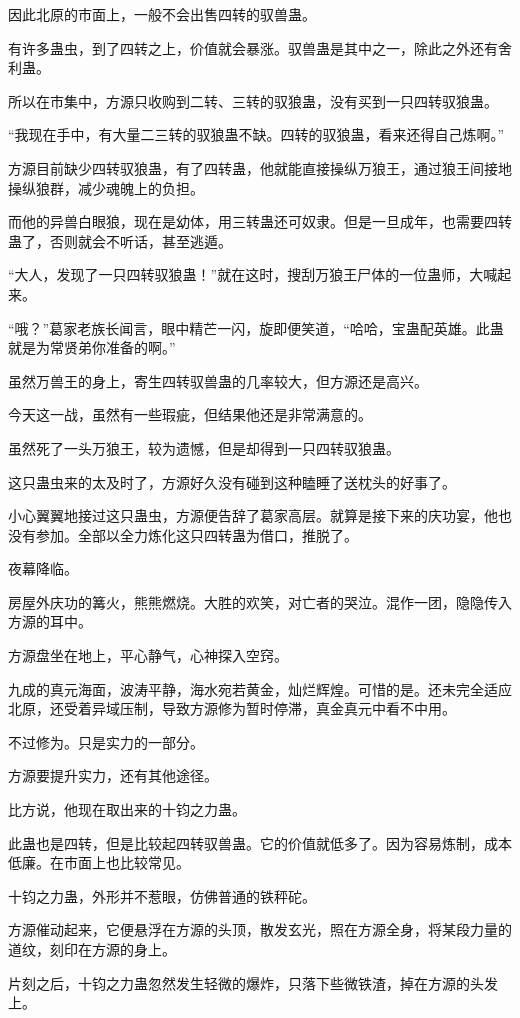 \begin{this_body}
因此北原的市面上，一般不会出售四转的驭兽蛊。

有许多蛊虫，到了四转之上，价值就会暴涨。驭兽蛊是其中之一，除此之外还有舍利蛊。

所以在市集中，方源只收购到二转、三转的驭狼蛊，没有买到一只四转驭狼蛊。

“我现在手中，有大量二三转的驭狼蛊不缺。四转的驭狼蛊，看来还得自己炼啊。”

方源目前缺少四转驭狼蛊，有了四转蛊，他就能直接操纵万狼王，通过狼王间接地操纵狼群，减少魂魄上的负担。

而他的异兽白眼狼，现在是幼体，用三转蛊还可奴隶。但是一旦成年，也需要四转蛊了，否则就会不听话，甚至逃遁。

“大人，发现了一只四转驭狼蛊！”就在这时，搜刮万狼王尸体的一位蛊师，大喊起来。

“哦？”葛家老族长闻言，眼中精芒一闪，旋即便笑道，“哈哈，宝蛊配英雄。此蛊就是为常贤弟你准备的啊。”

虽然万兽王的身上，寄生四转驭兽蛊的几率较大，但方源还是高兴。

今天这一战，虽然有一些瑕疵，但结果他还是非常满意的。

虽然死了一头万狼王，较为遗憾，但是却得到一只四转驭狼蛊。

这只蛊虫来的太及时了，方源好久没有碰到这种瞌睡了送枕头的好事了。

小心翼翼地接过这只蛊虫，方源便告辞了葛家高层。就算是接下来的庆功宴，他也没有参加。全部以全力炼化这只四转蛊为借口，推脱了。

夜幕降临。

房屋外庆功的篝火，熊熊燃烧。大胜的欢笑，对亡者的哭泣。混作一团，隐隐传入方源的耳中。

方源盘坐在地上，平心静气，心神探入空窍。

九成的真元海面，波涛平静，海水宛若黄金，灿烂辉煌。可惜的是。还未完全适应北原，还受着异域压制，导致方源修为暂时停滞，真金真元中看不中用。

不过修为。只是实力的一部分。

方源要提升实力，还有其他途径。

比方说，他现在取出来的十钧之力蛊。

此蛊也是四转，但是比较起四转驭兽蛊。它的价值就低多了。因为容易炼制，成本低廉。在市面上也比较常见。

十钧之力蛊，外形并不惹眼，仿佛普通的铁秤砣。

方源催动起来，它便悬浮在方源的头顶，散发玄光，照在方源全身，将某段力量的道纹，刻印在方源的身上。

片刻之后，十钧之力蛊忽然发生轻微的爆炸，只落下些微铁渣，掉在方源的头发上。


\end{this_body}
